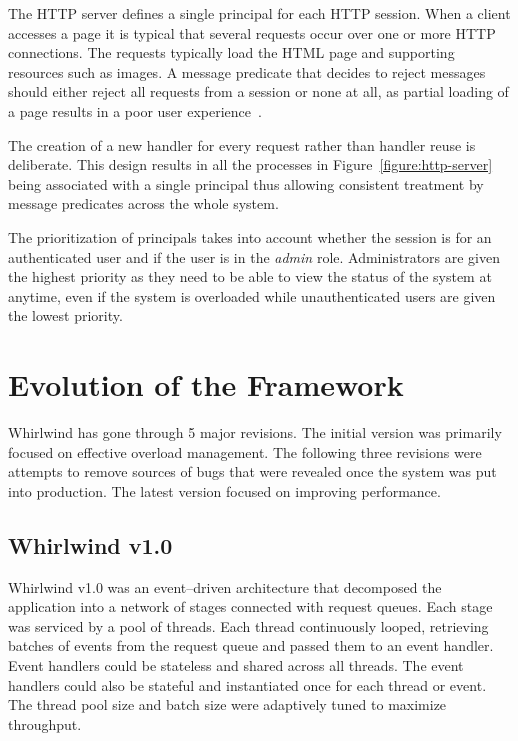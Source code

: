 \documentclass[conference]{IEEEtran}
\begin{document}
The HTTP server defines a single principal for each HTTP session. When a client accesses a page it is typical that several requests occur over one or more HTTP connections. The requests typically load the HTML page and supporting resources such as images. A message predicate that decides to reject messages should either reject all requests from a session or none at all, as partial loading of a page results in a poor user experience~\cite{Cherkasova:2002yb}. 

The creation of a new handler for every request rather than handler reuse is deliberate. This design results in all the processes in Figure~\ref{figure:http-server} being  associated with a single principal thus allowing consistent treatment by message predicates across the whole system.

The prioritization of principals takes into account whether the session is for an authenticated user and if the user is in the \emph{admin} role. Administrators are given the highest priority as they need to be able to view the status of the system at anytime, even if the system is overloaded while unauthenticated users are given the lowest priority.

\section{Evolution of the Framework}

Whirlwind has gone through 5 major revisions. The initial version was primarily focused on effective overload management. The following three revisions were attempts to remove sources of bugs that were revealed once the system was put into production. The latest version focused on improving performance.

\subsection{Whirlwind v1.0}

Whirlwind v1.0 was an event--driven architecture that decomposed the application into a network of stages connected with request queues. Each stage was serviced by a pool of threads. Each thread continuously looped, retrieving batches of events from the request queue and passed them to an event handler. Event handlers could be stateless and shared across all threads. The event handlers could also be stateful and instantiated once for each thread or event. The thread pool size and batch size were adaptively tuned to maximize throughput. 
\end{document}
